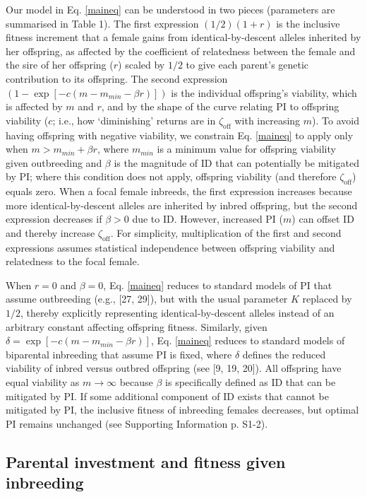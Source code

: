 \documentclass[12pt]{article}
\begin{document}
Our model in Eq. \ref{maineq} can be understood in two pieces (parameters are summarised in Table 1). The first expression $\left(1/2\right) \left(1 + r\right)$ is the inclusive fitness increment that a female gains from identical-by-descent alleles inherited by her offspring, as affected by the coefficient of relatedness between the female and the sire of her offspring ($r$) scaled by $1/2$ to give each parent's genetic contribution to its offspring. The second expression $\left(1 - \exp\left[-c\left(m-m_{min}-\beta r\right)\right]\right)$ is the individual offspring's viability, which is affected by $m$ and $r$, and by the shape of the curve relating PI to offspring viability ($c$; i.e., how `diminishing' returns are in $\zeta_{\textrm{off}}$ with increasing $m$). To avoid having offspring with negative viability, we constrain Eq. \ref{maineq} to apply only when $m > m_{min} + \beta r$, where $m_{min}$ is a minimum value for offspring viability given outbreeding and $\beta$ is the magnitude of ID that can potentially be mitigated by PI; where this condition does not apply, offspring viability (and therefore $\zeta_{\textrm{off}}$) equals zero. When a focal female inbreeds, the first expression increases because more identical-by-descent alleles are inherited by inbred offspring, but the second expression decreases if $\beta>0$ due to ID. However, increased PI ($m$) can offset ID and thereby increase $\zeta_{\textrm{off}}$. For simplicity, multiplication of the first and second expressions assumes statistical independence between offspring viability and relatedness to the focal female.

When $r=0$ and $\beta=0$, Eq. \ref{maineq} reduces to standard models of PI that assume outbreeding (e.g., [27, 29]), but with the usual parameter $K$ replaced by $1/2$, thereby explicitly representing identical-by-descent alleles instead of an arbitrary constant affecting offspring fitness. Similarly, given $\delta = \exp\left[-c\left(m-m_{min}-\beta r\right)\right]$, Eq. \ref{maineq} reduces to standard models of biparental inbreeding that assume PI is fixed, where $\delta$ defines the reduced viability of inbred versus outbred offspring (see [9, 19, 20]).  All offspring have equal viability as $m \to \infty$ because $\beta$ is specifically defined as ID that can be mitigated by PI. If some additional component of ID exists that cannot be mitigated by PI, the inclusive fitness of inbreeding females decreases, but optimal PI remains unchanged (see Supporting Information p. S1-2).

\subsection*{Parental investment and fitness given inbreeding}
\end{document}
